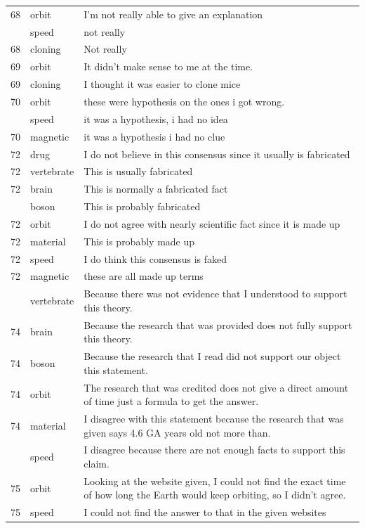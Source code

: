 \documentclass[
  doc,floatsintext]{apa6}
\begin{document}
\begin{longtable}[t]{>{}r>{}l>{\raggedright\arraybackslash}p{30em}}
68 & orbit & I'm not really able to give an explanation\\
\addlinespace
68 & speed & not really\\
68 & cloning & Not really\\
69 & orbit & It didn't make sense to me at the time.\\
69 & cloning & I thought it was easier to clone mice\\
70 & orbit & these were hypothesis on the ones i got wrong.\\
\addlinespace
70 & speed & it was a hypothesis, i had no idea\\
70 & magnetic & it was a hypothesis i had no clue\\
72 & drug & I do not believe in this consensus since it usually is fabricated\\
72 & vertebrate & This is usually fabricated\\
72 & brain & This is normally a fabricated fact\\
\addlinespace
72 & boson & This is probably fabricated\\
72 & orbit & I do not agree with nearly scientific fact since it is made up\\
72 & material & This is probably made up\\
72 & speed & I do think this consensus is faked\\
72 & magnetic & these are all made up terms\\
\addlinespace
74 & vertebrate & Because there was not evidence that I understood to support this theory.\\
74 & brain & Because the research that was provided does not fully support this theory.\\
74 & boson & Because the research that I read did not support our object this statement.\\
74 & orbit & The research that was credited does not give a direct amount of time just a formula to get the answer.\\
74 & material & I disagree with this statement because the research that was given says 4.6 GA years old not more than.\\
\addlinespace
74 & speed & I disagree because there are not enough facts to support this claim.\\
75 & orbit & Looking at the website given, I could not find the exact time of how long the Earth would keep orbiting, so I didn't agree.\\
75 & speed & I could not find the answer to that in the given websites\\

\end{longtable}
\end{document}
